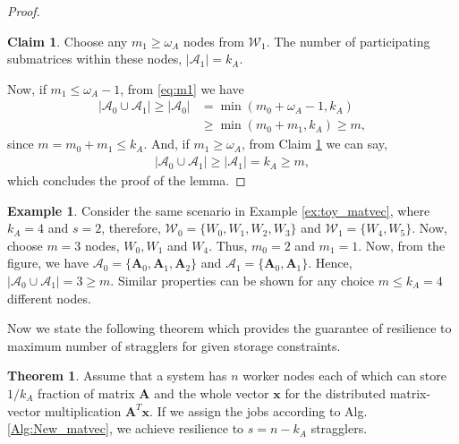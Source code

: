 \documentclass[conference]{IEEEtran}
\theoremstyle{definition}
\newtheorem{theorem}{Theorem}
\newtheorem{claim}{Claim}
\newtheorem{example}{Example}
\newcommand{\calA}{\mathcal{A}}
\newcommand{\calW}{\mathcal{W}}
\newcommand{\bfA}{\mathbf{A}}
\newcommand{\bfx}{\mathbf{x}}
\begin{document}
\begin{proof}
\begin{claim}
\label{clm:m1gw1}
Choose any $m_1 \geq \omega_A$ nodes from $\calW_1$. The number of participating submatrices within these nodes, $|\calA_1| = k_A$. 
\end{claim}


Now, if $m_1 \leq \omega_A - 1$, from \eqref{eq:m1} we have 
\begin{align*}
    |\calA_0 \cup \calA_1| \geq |\calA_0| & =  \min (m_0 + \omega_A - 1, k_A) \\ 
    & \geq  \min (m_0 + m_1, k_A) \geq m ,
\end{align*} since $m = m_0 + m_1 \leq k_A$. And, if $m_1 \geq \omega_A$, from Claim \ref{clm:m1gw1} we can say,
\begin{align*}
    |\calA_0 \cup \calA_1| \geq |\calA_1| =  k_A \geq m,
\end{align*} which concludes the proof of the lemma.
\end{proof}

\begin{example}
Consider the same scenario in Example \ref{ex:toy_matvec}, where $k_A = 4$ and $s = 2$, therefore, $\calW_0 = \{W_0, W_1, W_2, W_3\}$ and $\calW_1 = \{ W_4, W_5 \}$. Now, choose $m = 3$ nodes, $W_0, W_1$ and $W_4$. Thus, $m_0 = 2$ and $m_1 = 1$. Now, from the figure, we have $\calA_0 = \{\bfA_0, \bfA_1, \bfA_2\}$ and $\calA_1 = \{\bfA_0, \bfA_1\}$. Hence, $|\calA_0 \cup \calA_1| = 3 \geq m$. Similar properties can be shown for any choice $m \leq k_A = 4$ different nodes.
\end{example}

Now we state the following theorem which provides the guarantee of resilience to maximum number of stragglers for given storage constraints.

\begin{theorem}
\label{thm:matvec}
Assume that a system has $n$ worker nodes each of which can store $1/k_A$ fraction of matrix $\bfA$ and the whole vector $\bfx$ for the distributed matrix-vector multiplication $\mathbf{A}^T \mathbf{x}$. If we assign the jobs according to Alg. \ref{Alg:New_matvec}, we achieve resilience to $s = n - k_A$ stragglers.
\end{theorem}
\end{document}
